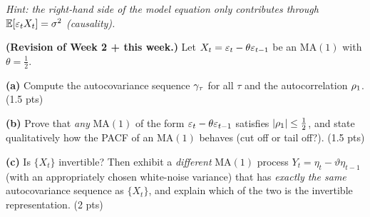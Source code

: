 \documentclass[11pt]{article}
\begin{document}
\emph{Hint: the right-hand side of the model equation only contributes through $\mathbb{E}[\varepsilon_t X_t]=\sigma^2$ (causality).}
\answerpage

\textbf{(Revision of Week 2 + this week.)} Let $X_t=\varepsilon_t-\theta\varepsilon_{t-1}$ be an $\mathrm{MA}(1)$ with $\theta=\tfrac12$.

\textbf{(a)} Compute the autocovariance sequence $\gamma_\tau$ for all $\tau$ and the autocorrelation $\rho_1$. \hfill(1.5 pts)

\textbf{(b)} Prove that \emph{any} $\mathrm{MA}(1)$ of the form $\varepsilon_t-\theta\varepsilon_{t-1}$ satisfies $\left\lvert \rho_1 \right\rvert\le\tfrac12$, and state qualitatively how the PACF of an $\mathrm{MA}(1)$ behaves (cut off or tail off?). \hfill(1.5 pts)

\textbf{(c)} Is $\{X_t\}$ invertible? Then exhibit a \emph{different} $\mathrm{MA}(1)$ process $Y_t=\eta_t-\vartheta\eta_{t-1}$ (with an appropriately chosen white-noise variance) that has \emph{exactly the same} autocovariance sequence as $\{X_t\}$, and explain which of the two is the invertible representation. \hfill(2 pts)
\answerpage
\end{document}

